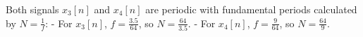 
\item[(c)]
Both signals $x_{3}[n]$ and $x_{4}[n]$ are periodic with fundamental periods calculated by $N = \frac{1}{f}$:
- For $x_{3}[n]$, $f = \frac{3.5}{64}$, so $N = \frac{64}{3.5}$.
- For $x_{4}[n]$, $f = \frac{9}{64}$, so $N = \frac{64}{9}$.
